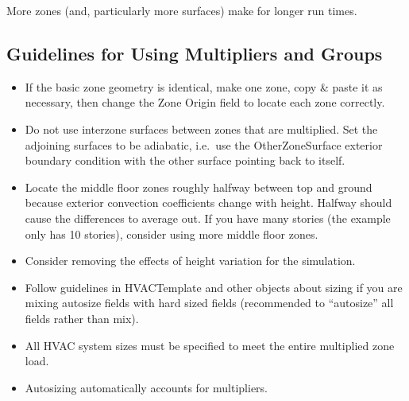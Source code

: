 More zones (and, particularly more surfaces) make for longer run times.

\subsection{Guidelines for Using Multipliers and Groups}\label{guidelines-for-using-multipliers-and-groups}

\begin{itemize}
\item
  If the basic zone geometry is identical, make one zone, copy \& paste it as necessary, then change the Zone Origin field to locate each zone correctly.
\item
  Do not use interzone surfaces between zones that are multiplied. Set the adjoining surfaces to be adiabatic, i.e.~use the OtherZoneSurface exterior boundary condition with the other surface pointing back to itself.
\item
  Locate the middle floor zones roughly halfway between top and ground because exterior convection coefficients change with height. Halfway should cause the differences to average out. If you have many stories (the example only has 10 stories), consider using more middle floor zones.
\item
  Consider removing the effects of height variation for the simulation.
\item
  Follow guidelines in HVACTemplate and other objects about sizing if you are mixing autosize fields with hard sized fields (recommended to ``autosize'' all fields rather than mix).
\item
  All HVAC system sizes must be specified to meet the entire multiplied zone load.
\item
  Autosizing automatically accounts for multipliers.
\end{itemize}
